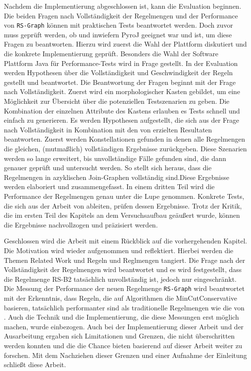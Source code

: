 Nachdem die Implementierung abgeschlossen ist, kann die Evaluation beginnen. Die beiden Fragen nach Vollständigkeit der Regelmengen und der Performance von \texttt{RS-Graph} können mit praktischen Tests beantwortet werden. Doch zuvor muss geprüft werden, ob und inwiefern PyroJ geeignet war und ist, um diese Fragen zu beantworten. Hierzu wird zuerst die Wahl  der Plattform diskutiert und die konkrete Implementierung geprüft. Besonders die Wahl der Software Plattform Java für Performance-Tests wird in Frage gestellt. In der Evaluation werden Hypothesen über die Vollständigkeit und Geschwindigkeit der Regeln gestellt und beantwortet. Die Beantwortung der Fragen beginnt mit der Frage nach Vollständigkeit. Zuerst wird ein morphologischer Kasten gebildet, um eine Möglichkeit zur Übersicht über die potenziellen Testszenarien zu geben. Die Kombination der einzelnen Attribute des Kastens erlauben es Tests schnell und einfach zu generieren. Es werden Hypothesen aufgestellt, die sich aus der Frage nach Vollständigkeit in Kombination mit den von \cite{shanbhag2014optimizing} erzielten Resultaten  beantworten. Zuerst werden Konstellationen gefunden in denen alle Regelmengen die gleichen, (mutmaßlich) vollständigen Ergebnisse zurückgeben. Diese Szenarien werden so lange erweitert, bis unvollständige Fälle gefunden sind, die dann genauer geprüft und untersucht werden. So stellt sich heraus, dass die Regelmengen in azyklischen Join-Graphen vollständig sind.Diese Ergebnisse werden elaboriert und zusammengefasst. In einem dritten Teil wird die Performance der Regelmengen genau unter die Lupe genommen. Konkrete Tests, die sich aus der Arbeit von \cite{shanbhag2014optimizing} ableiten, prüfen dessen Ergebnisse. Trotz der Kritik, die im ersten Teil des Kapitels an dem Versuchsaufbau geäußert wurde, können die Ergebnisse nachvollzogen und präzisiert werden.

Geschlossen wird die Arbeit mit einem Rückblick auf die vorhergehenden Kapitel. Die Motivation wird wieder aufgenommen und reflektiert. Hierbei werden die Themen Related Work und Regeln und Reglmengen tangiert. Die Frage nach der Vollständigkeit der Regelmengen wird beantwortet und es wird festgestellt, dass die Regelmenge RS-B2 tatsächlich unvollständig ist, jedoch nur eingeschränkt. Die Messung der Performance der neuen Regelmenge \texttt{RS-Graph} wird beantwortet mit der Erkenntnis, dass Regeln, die auf Algorithmen die MinCutConservative basieren, tatsächlich performanter sind als traditionelle Regelmengen wie die von \cite{pellenkoft1997complexity}. Auch die Technik und die Implementierung, die diese Messungen erst möglich machen, wurde einbezogen. Auch bei der Implementierung dieser Arbeit und der Ausarbeitung ergaben sich Limitationen und Grenzen, die nicht überschritten werden konnten und die die Chance bieten basierend auf dieser Arbeit weiter zu forschen. Mit dem Nachziehen dieser Grenzen und einer Aufnahme der Einleitung schließt diese Arbeit.